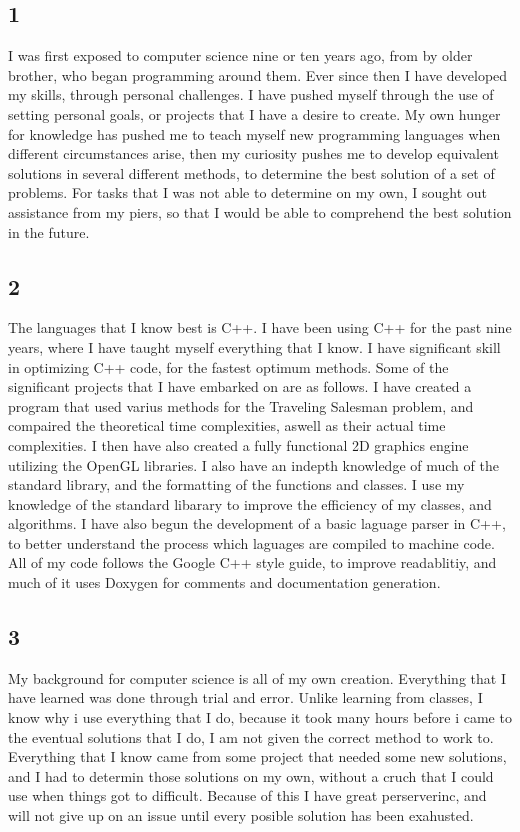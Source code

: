 \documentclass[11pt,a4paper,sans]{moderncv}
\begin{document}
\subsection{1}
I was first exposed to computer science nine or ten years ago, from by older
brother, who began programming around them. Ever since then I have developed my
skills, through personal challenges. I have pushed myself through the use of
setting personal goals, or projects that I have a desire to create. My own
hunger for knowledge has pushed me to teach myself new programming languages
when different circumstances arise, then my curiosity pushes me to develop
equivalent solutions in several different methods, to determine the best solution
of a set of problems. For tasks that I was not able to determine on my own, I
sought out assistance from my piers, so that I would be able to comprehend the
best solution in the future.

\subsection{2}
The languages that I know best is C++. I have been using C++ for the past nine
years, where I have taught myself everything that I know. I have significant
skill in optimizing C++ code, for the fastest optimum methods. Some of the
significant projects that I have embarked on are as follows. I have created a
program that used varius methods for the Traveling Salesman problem, and
compaired the theoretical time complexities, aswell as their actual time
complexities. I then have also created a fully functional 2D graphics engine
utilizing the OpenGL libraries. I also have an indepth knowledge of much of the
standard library, and the formatting of the functions and classes. I use my
knowledge of the standard libarary to improve the efficiency of my classes, and
algorithms. I have also begun the development of a basic laguage parser in C++,
to better understand the process which laguages are compiled to machine code.
All of my code follows the Google C++ style guide, to improve readablitiy, and
much of it uses Doxygen for comments and documentation generation.

\subsection{3}
My background for computer science is all of my own creation. Everything that I
have learned was done through trial and error. Unlike learning from classes, I
know why i use everything that I do, because it took many hours before i came to
the eventual solutions that I do, I am not given the correct method to work to.
Everything that I know came from some project that needed some new solutions,
and I had to determin those solutions on my own, without a cruch that I could
use when things got to difficult. Because of this I have great perserverinc,
and will not give up on an issue until every posible solution has been
exahusted.
\end{document}
